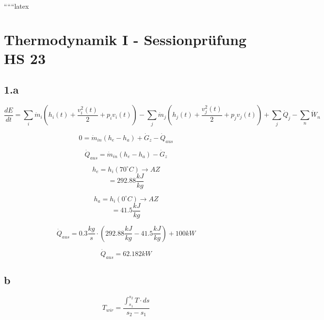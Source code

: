 
``````latex


\section*{Thermodynamik I - Sessionprüfung HS 23}

\subsection*{1.a}
\begin{equation*}
\frac{dE}{dt} = \sum_i \dot{m}_i (h_i(t) + \frac{v_i^2(t)}{2} + p_i v_i(t)) - \sum_j \dot{m}_j (h_j(t) + \frac{v_j^2(t)}{2} + p_j v_j(t)) + \sum_j \dot{Q}_j - \sum_n \dot{W}_n
\end{equation*}

\begin{equation*}
0 = \dot{m}_{in} (h_e - h_a) + \dot{G}_z - \dot{Q}_{aus}
\end{equation*}

\begin{equation*}
\dot{Q}_{aus} = \dot{m}_{in} (h_e - h_a) - \dot{G}_z
\end{equation*}

\begin{equation*}
h_e = h_i (70^\circ C) \rightarrow AZ
\end{equation*}
\begin{equation*}
= 292.88 \frac{kJ}{kg}
\end{equation*}

\begin{equation*}
h_a = h_i (0^\circ C) \rightarrow AZ
\end{equation*}
\begin{equation*}
= 41.5 \frac{kJ}{kg}
\end{equation*}

\begin{equation*}
\dot{Q}_{aus} = 0.3 \frac{kg}{s} \cdot (292.88 \frac{kJ}{kg} - 41.5 \frac{kJ}{kg}) + 100 kW
\end{equation*}

\begin{equation*}
\dot{Q}_{aus} = 62.182 kW
\end{equation*}

\subsection*{b}
\begin{equation*}
T_{wir} = \frac{\int_{s_1}^{s_2} T \cdot ds}{s_2 - s_1}
\end{equation*}

